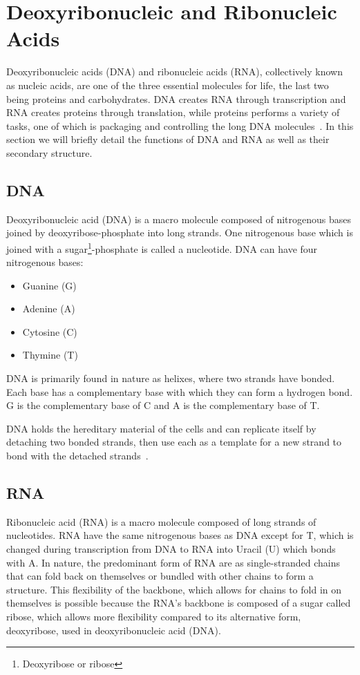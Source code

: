 \section{Deoxyribonucleic and Ribonucleic Acids}
Deoxyribonucleic acids (DNA) and ribonucleic acids (RNA), collectively known as 
nucleic acids, are one of the three 
essential molecules for life, the last two being proteins and carbohydrates. 
DNA creates RNA through transcription and RNA creates proteins through 
translation, while proteins performs a variety of tasks, one 
of which is packaging and controlling the long DNA molecules~\cite[p. 172]{alberts}. 
In this section we will briefly detail the functions of DNA and RNA as well as their 
secondary structure.
\subsection{DNA}
Deoxyribonucleic acid (DNA) is a macro molecule composed of nitrogenous bases 
joined by deoxyribose-phosphate into long strands. One nitrogenous base which 
is joined with a sugar\footnote{Deoxyribose or ribose}-phosphate is called a 
nucleotide. DNA can have four nitrogenous bases:
\begin{itemize}
\item Guanine (G)
\item Adenine (A)
\item Cytosine (C)
\item Thymine (T)
\end{itemize}
DNA is primarily found in nature as helixes, where two strands have bonded. Each 
base has a complementary base with which they can form a hydrogen bond. 
G is the complementary base of C and A is the complementary base of T.

DNA holds the hereditary material of the cells and can replicate itself by 
detaching two bonded strands, then use each as a template for a new strand 
to bond with the detached strands~\cite[p. 199]{alberts}.
\subsection{RNA}
Ribonucleic acid (RNA) is a macro molecule composed of long strands of 
nucleotides. RNA have the same nitrogenous bases as DNA except for T, which is 
changed during transcription from DNA to RNA into Uracil (U) which bonds with 
A. In nature, the predominant form of RNA are as single-stranded chains that 
can fold back on themselves or bundled with other chains to form a structure. This 
flexibility of the backbone, which allows for chains to fold in on themselves is 
possible because the RNA's backbone is composed of a sugar called ribose, which 
allows more flexibility compared to its alternative form, deoxyribose, used in 
deoxyribonucleic acid (DNA).


